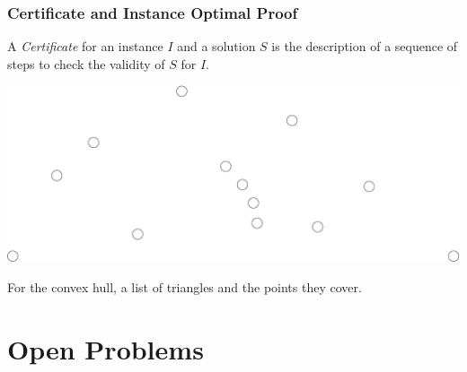 \begin{frame}
  \frametitle{Certificate and Instance Optimal Proof}
  \begin{definition}[Certificate]
    A \emph{Certificate} for an instance $I$ and a solution $S$ is the
    description of a sequence of steps to \alert{check} the validity
    of $S$ for $I$.
  \end{definition}
  \includegraphics[width=\textwidth]{points}
  \begin{example}
    For the convex hull, a list of triangles and the points they
    cover.
  \end{example}
\end{frame}


\section{Open Problems}




